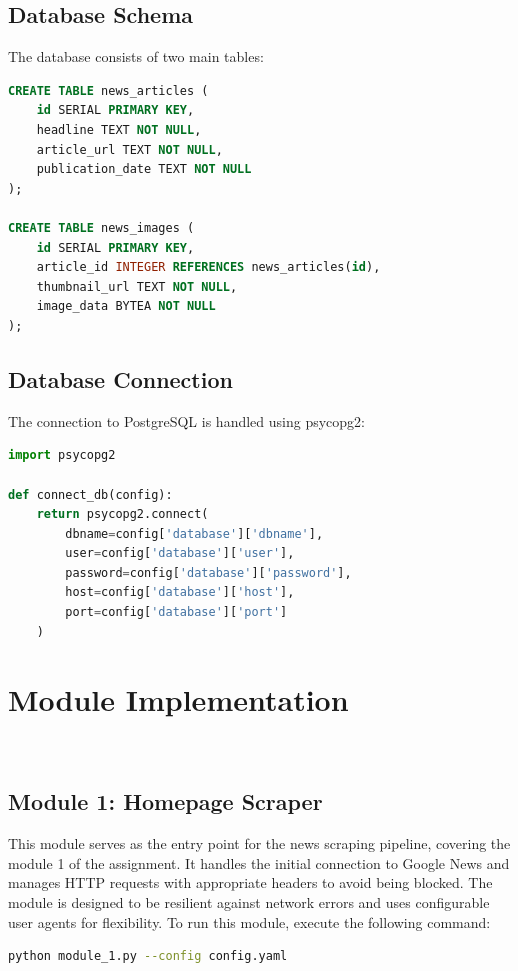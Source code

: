 \documentclass{article}
\begin{document}
\subsection{Database Schema}
The database consists of two main tables:

\begin{lstlisting}[language=SQL]
CREATE TABLE news_articles (
    id SERIAL PRIMARY KEY,
    headline TEXT NOT NULL,
    article_url TEXT NOT NULL,
    publication_date TEXT NOT NULL
);

CREATE TABLE news_images (
    id SERIAL PRIMARY KEY,
    article_id INTEGER REFERENCES news_articles(id),
    thumbnail_url TEXT NOT NULL,
    image_data BYTEA NOT NULL
);
\end{lstlisting}

\subsection{Database Connection}
The connection to PostgreSQL is handled using psycopg2:

\begin{lstlisting}[language=Python]
import psycopg2

def connect_db(config):
    return psycopg2.connect(
        dbname=config['database']['dbname'],
        user=config['database']['user'],
        password=config['database']['password'],
        host=config['database']['host'],
        port=config['database']['port']
    )
\end{lstlisting}

\section{Module Implementation}
 \\

\subsection{Module 1: Homepage Scraper}
This module serves as the entry point for the news scraping pipeline, covering the module 1 of the assignment. It handles the initial connection to Google News and manages HTTP requests with appropriate headers to avoid being blocked. The module is designed to be resilient against network errors and uses configurable user agents for flexibility.
To run this module, execute the following command:
\begin{lstlisting}[language=bash]
python module_1.py --config config.yaml
\end{lstlisting}
\end{document}
